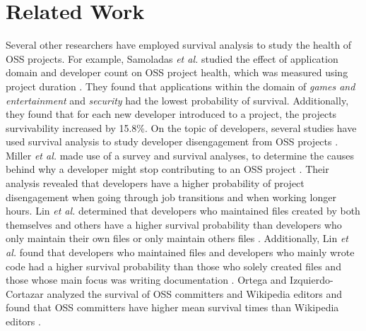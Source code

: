 \documentclass[sigconf]{acmart}
\begin{document}
\section{Related Work} \label{related}
Several other researchers have employed survival analysis to study the health of OSS projects. 
For example, Samoladas \emph{et al.} studied the effect of application domain and developer count on OSS project health, which was measured using project duration \cite{samoladas2010survival}. 
They found that applications within the domain of \emph{games and entertainment} and \emph{security} had the lowest probability of survival. 
Additionally, they found that for each new developer introduced to a project, the projects survivability increased by 15.8\%.
On the topic of developers, several studies have used survival analysis to study developer disengagement from OSS projects \cite{miller2019people,lin2017developer,ortega2009survival}. 
Miller \emph{et al.} made use of a survey and survival analyses, to determine the causes behind why a developer might stop contributing to an OSS project \cite{miller2019people}. 
Their analysis revealed that developers have a higher probability of project disengagement when going through job transitions and when working longer hours. 
Lin \emph{et al.} determined that developers who maintained files created by both themselves and others have a higher survival probability than developers who only maintain their own files or only maintain others files \cite{lin2017developer}. 
Additionally, Lin \emph{et al.} found that developers who maintained files and developers who mainly wrote code had a higher survival probability than those who solely created files and those whose main focus was writing documentation \cite{lin2017developer}. 
Ortega and Izquierdo-Cortazar analyzed the survival of OSS committers and Wikipedia editors and found that OSS committers have higher mean survival times than Wikipedia editors \cite{ortega2009survival}. 
\end{document}
